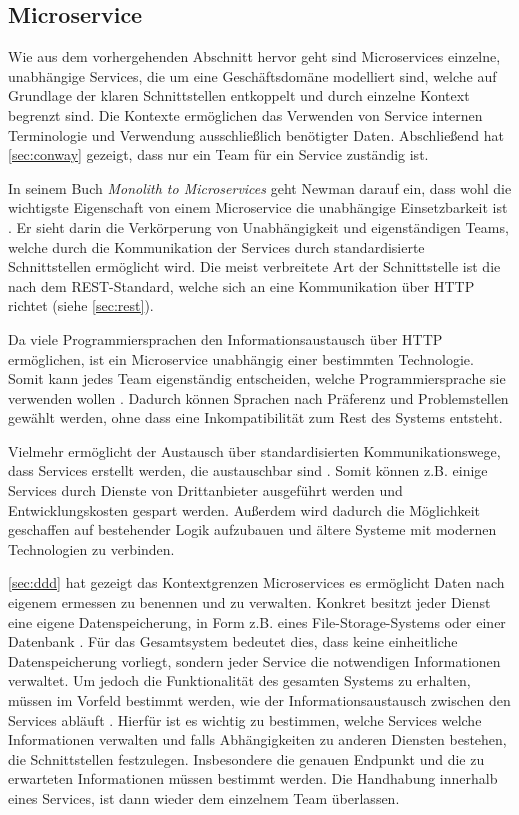 \subsection{Microservice}

Wie aus dem vorhergehenden Abschnitt hervor geht sind Microservices einzelne, unabhängige Services, die um eine Geschäftsdomäne modelliert sind, welche auf Grundlage der klaren Schnittstellen entkoppelt und durch einzelne Kontext begrenzt sind. Die Kontexte ermöglichen das Verwenden von Service internen Terminologie und Verwendung ausschließlich benötigter Daten. Abschließend hat \cref{sec:conway} gezeigt, dass nur ein Team für ein Service zuständig ist.

In seinem Buch \textit{Monolith to Microservices} geht Newman darauf ein, dass wohl die wichtigste Eigenschaft von einem Microservice die unabhängige Einsetzbarkeit ist \parencite[vgl.][Kap. 2.1.1]{newman_monolith_2019}. Er sieht darin die Verkörperung von Unabhängigkeit und eigenständigen Teams, welche durch die Kommunikation der Services durch standardisierte Schnittstellen ermöglicht wird. Die meist verbreitete Art der Schnittstelle ist die nach dem REST-Standard, welche sich an eine Kommunikation über HTTP richtet (siehe \cref{sec:rest}).
 
Da viele Programmiersprachen den Informationsaustausch über HTTP ermöglichen, ist ein Microservice unabhängig einer bestimmten Technologie. Somit kann jedes Team eigenständig entscheiden, welche Programmiersprache sie verwenden wollen \parencite[vgl.][Kap. 1.2]{wolff_microservices_2018}. Dadurch können Sprachen nach Präferenz und Problemstellen gewählt werden, ohne dass eine Inkompatibilität zum Rest des Systems entsteht.

Vielmehr ermöglicht der Austausch über standardisierten Kommunikationswege, dass Services erstellt werden, die austauschbar sind \parencite[vgl.][Kap. 1.2]{wolff_microservices_2018}. Somit können z.B. einige Services durch Dienste von Drittanbieter ausgeführt werden und Entwicklungskosten gespart werden. Außerdem wird dadurch die Möglichkeit geschaffen auf bestehender Logik aufzubauen und ältere Systeme mit modernen Technologien zu verbinden.

\cref{sec:ddd} hat gezeigt das Kontextgrenzen Microservices es ermöglicht Daten nach eigenem ermessen zu benennen und zu verwalten. Konkret besitzt jeder Dienst eine eigene Datenspeicherung, in Form z.B. eines File-Storage-Systems oder einer Datenbank \parencite[vgl.][Kap. 2.1.3]{newman_monolith_2019}. Für das Gesamtsystem bedeutet dies, dass keine einheitliche Datenspeicherung vorliegt, sondern jeder Service die notwendigen Informationen verwaltet. Um jedoch die Funktionalität des gesamten Systems zu erhalten, müssen im Vorfeld bestimmt werden, wie der Informationsaustausch zwischen den Services abläuft \parencite[vgl.][Kap. 4.1]{wolff_microservices_2018}. Hierfür ist es wichtig zu bestimmen, welche Services welche Informationen verwalten und falls Abhängigkeiten zu anderen Diensten bestehen, die Schnittstellen festzulegen. Insbesondere die genauen Endpunkt und die zu erwarteten Informationen müssen bestimmt werden. Die Handhabung innerhalb eines Services, ist dann wieder dem einzelnem Team überlassen. 

